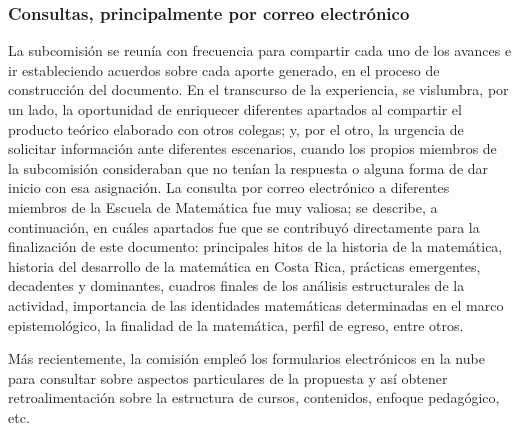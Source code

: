 \subsubsection{Consultas, principalmente por correo electrónico}

La subcomisión se reunía con frecuencia para compartir cada uno de los avances e ir estableciendo acuerdos sobre cada aporte generado, en el proceso de construcción del documento. En el transcurso de la experiencia, se vislumbra, por un lado, la oportunidad de enriquecer diferentes apartados al compartir el producto teórico elaborado con otros colegas; y, por el otro, la urgencia de solicitar información ante diferentes escenarios, cuando los propios miembros de la subcomisión consideraban que no tenían la respuesta o alguna forma de dar inicio con esa asignación. La consulta por correo electrónico a diferentes miembros de la Escuela de Matemática fue muy valiosa; se describe, a continuación, en cuáles apartados fue que se contribuyó directamente para la finalización de este documento: principales hitos de la historia de la matemática, historia del desarrollo de la matemática en Costa Rica, prácticas emergentes, decadentes y dominantes, cuadros finales de los análisis estructurales de la actividad, importancia de las identidades matemáticas determinadas en el marco epistemológico, la finalidad de la matemática, perfil de egreso, entre otros.

Más recientemente, la comisión empleó los formularios electrónicos en la nube para consultar sobre aspectos particulares de la propuesta y así obtener retroalimentación sobre la estructura de cursos, contenidos, enfoque pedagógico, etc.
